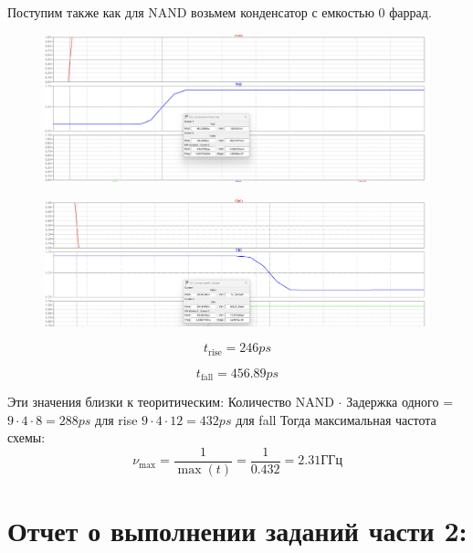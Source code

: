 \documentclass[12pt,onecolumn]{article}
\begin{document}
Поступим также как для NAND возьмем конденсатор с емкостью 0 фаррад.
\begin{figure}[H]
    \centering
    \includegraphics[width=\textwidth]{image/rise-2.png}
\end{figure}
\begin{figure}[H]
    \centering
    \includegraphics[width=\textwidth]{image/fall-2.png}
\end{figure}
$$t_{\text{rise}} = 246 ps$$

$$t_{\text{fall}} = 456.89 ps$$

Эти значения близки к теоритическим: Количество NAND $\cdot$ Задержка одного = $9 \cdot 4 \cdot 8 = 288 ps $ для  rise
$9 \cdot 4 \cdot 12 = 432 ps $ для  fall
Тогда максимальная частота схемы:
$$ \nu_{\max} = \frac{1}{\max(t)}= \frac{1}{0.432} = 2.31\text{ГГц}$$

\section{Отчет о выполнении заданий части 2:}
\end{document}
